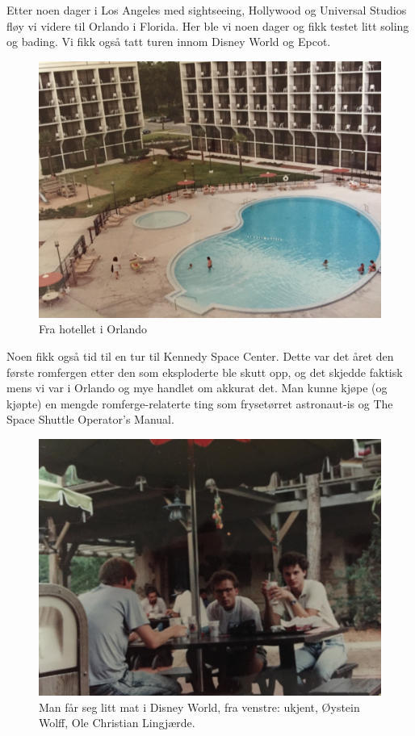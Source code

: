 \documentclass[../../main.tex]{subfiles}
\begin{document}
Etter noen dager i Los Angeles med sightseeing, Hollywood og Universal Studios fløy vi videre til Orlando i Florida. Her ble vi noen dager og fikk testet litt soling og bading. Vi fikk også tatt turen innom Disney World og Epcot. 

\begin{figure}
	\includegraphics[width=\linewidth]{images/usa88/IMG_3852.jpg}
	\caption{Fra hotellet i Orlando}
\end{figure}

Noen fikk også tid til en tur til Kennedy Space Center. Dette var det året den første romfergen etter den som eksploderte ble skutt opp, og det skjedde faktisk mens vi var i Orlando og mye handlet om akkurat det. Man kunne kjøpe (og kjøpte) en mengde romferge-relaterte ting som frysetørret astronaut-is og The Space Shuttle Operator’s Manual. 

\begin{figure}
	\includegraphics[width=\linewidth]{images/usa88/IMG_3850.jpg}
	\caption{Man får seg litt mat i Disney World, fra venstre: ukjent, Øystein Wolff, Ole Christian Lingjærde.}
\end{figure}
\end{document}
